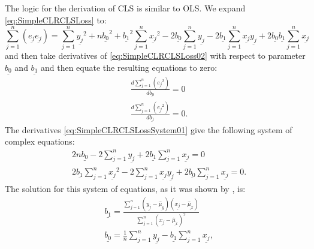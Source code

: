 \documentclass[
]{book}
\begin{document}
The logic for the derivation of CLS is similar to OLS. We expand \eqref{eq:SimpleCLRCLSLoss} to:
\begin{equation}
    \sum_{j=1}^n (\underline{e_j} \underline{e_j}) = \sum_{j=1}^n \underline{y_j}^2 + n \underline{b_0}^2 + \underline{b_1}^2 \sum_{j=1}^n \underline{x_j}^2 - 2 \underline{b_0} \sum_{j=1}^n \underline{y_j} - 2 \underline{b_1} \sum_{j=1}^n \underline{x_j} \underline{y_j} + 2 \underline{b_0} \underline{b_1} \sum_{j=1}^n \underline{x_j} 
    \label{eq:SimpleCLRCLSLoss02}
\end{equation}
and then take derivatives of \eqref{eq:SimpleCLRCLSLoss02} with respect to parameter \(\underline{b_0}\) and \(\underline{b_1}\) and then equate the resulting equations to zero:
\begin{equation}
    \begin{aligned}
        & \frac{d \sum_{j=1}^n (\underline{e_j}^2)}{d \underline{b_0}} = 0 \\
        & \frac{d \sum_{j=1}^n (\underline{e_j}^2)}{d \underline{b_1}} = 0 .
    \end{aligned}
    \label{eq:SimpleCLRCLSLossSystem01}
\end{equation}
The derivatives \eqref{eq:SimpleCLRCLSLossSystem01} give the following system of complex equations:
\begin{equation}
    \begin{aligned}
        & 2 n \underline{b_0} - 2 \sum_{j=1}^n \underline{y_j} + 2 \underline{b_1} \sum_{j=1}^n \underline{x_j} = 0 \\
        & 2 \underline{b_1} \sum_{j=1}^n \underline{x_j}^2 - 2 \sum_{j=1}^n \underline{x_j} \underline{y_j} + 2 \underline{b_0} \sum_{j=1}^n \underline{x_j} = 0 .
    \end{aligned}
    \label{eq:SimpleCLRCLSLossSystem02}
\end{equation}
The solution for this system of equations, as it was shown by \citet{Svetunkov2012}, is:
\begin{equation}
    \begin{aligned}
        & \underline{b_1} = \frac{\sum_{j=1}^n (\underline{y_{j}}-\underline{\hat{\mu}_{y}}) (\underline{{x}_j}-\underline{\hat{\mu}_{x}})}{\sum_{j=1}^n (\underline{{x}_j}-\underline{\hat{\mu}_{x}})^2} \\
        & \underline{b_0} = \frac{1}{n} \sum_{j=1}^n \underline{y_j} - \underline{b_1} \sum_{j=1}^n \underline{x_j} ,
    \end{aligned}
    \label{eq:SimpleCLRCLSLossParameters}
\end{equation}
\end{document}
